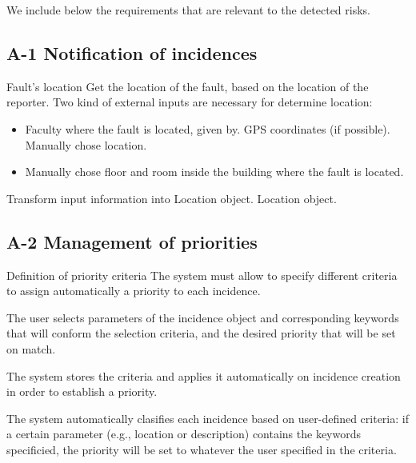 We include below the requirements that are relevant to the detected risks.

\subsection{A-1 Notification of incidences}

\begin{requirement}{Fault's location}
\reqdesc Get the location of the fault, based on the location of the reporter.
\reqin Two kind of external inputs are necessary for determine location:
\begin{itemize}
\item Faculty where the fault is located, given by.
\subitem GPS coordinates (if possible).
\subitem Manually chose location.
\item Manually chose floor and room inside the building where the fault is located.
\end{itemize}
\reqsteps Transform input information into Location object.
\reqout Location object.
\end{requirement}


\subsection{A-2 Management of priorities}
\begin{requirement}{Definition of priority criteria}
\reqdesc The system must allow to specify different criteria to assign automatically a priority to each incidence.

\reqin The user selects parameters of the incidence object and corresponding keywords that will conform the selection criteria, and the desired priority that will be set on match.

\reqsteps The system stores the criteria and applies it automatically on incidence creation in order to establish a priority.

\reqout The system automatically clasifies each incidence based on user-defined criteria: if a certain parameter (e.g., location or description) contains the keywords specificied, the priority will be set to whatever the user specified in the criteria.
\end{requirement}


